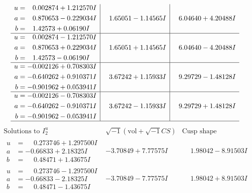 \documentclass[1p]{elsarticle_modified}
\theoremstyle{definition}
\newcommand{\I}{\sqrt{-1}}
\begin{document}
$$\begin{array}{c|c|c}
\begin{aligned}
u &= \phantom{-}0.002874 + 1.212570 I \\
a &= \phantom{-}0.870653 - 0.229034 I \\
b &= \phantom{-}1.42573 + 0.06190 I\end{aligned}
 & \phantom{-}1.65051 - 1.14565 I & \phantom{-}6.04640 + 4.20488 I \\ \hline\begin{aligned}
u &= \phantom{-}0.002874 - 1.212570 I \\
a &= \phantom{-}0.870653 + 0.229034 I \\
b &= \phantom{-}1.42573 - 0.06190 I\end{aligned}
 & \phantom{-}1.65051 + 1.14565 I & \phantom{-}6.04640 - 4.20488 I \\ \hline\begin{aligned}
u &= -0.002126 + 0.708303 I \\
a &= -0.640262 + 0.910371 I \\
b &= -0.901962 + 0.053941 I\end{aligned}
 & \phantom{-}3.67242 + 1.15933 I & \phantom{-}9.29729 - 1.48128 I \\ \hline\begin{aligned}
u &= -0.002126 - 0.708303 I \\
a &= -0.640262 - 0.910371 I \\
b &= -0.901962 - 0.053941 I\end{aligned}
 & \phantom{-}3.67242 - 1.15933 I & \phantom{-}9.29729 + 1.48128 I\\
 \hline 
 \end{array}$$\newpage$$\begin{array}{c|c|c}  
\text{Solutions to }I^u_{2}& \I (\text{vol} + \sqrt{-1}CS) & \text{Cusp shape}\\
 \hline 
\begin{aligned}
u &= \phantom{-}0.273746 + 1.297500 I \\
a &= -0.66833 + 2.18325 I \\
b &= \phantom{-}0.48471 + 1.43675 I\end{aligned}
 & -3.70849 + 7.77575 I & \phantom{-}1.98042 - 8.91503 I \\ \hline\begin{aligned}
u &= \phantom{-}0.273746 - 1.297500 I \\
a &= -0.66833 - 2.18325 I \\
b &= \phantom{-}0.48471 - 1.43675 I\end{aligned}
 & -3.70849 - 7.77575 I & \phantom{-}1.98042 + 8.91503 I \\ \hline\begin{aligned}

\end{aligned}
\end{array}$$
\end{document}
